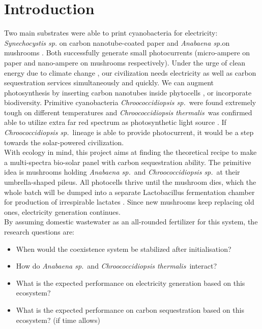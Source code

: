 \documentclass[a4paper, 11pt]{article}
\newcommand{\As}{\textit{Anabaena sp.}}
\newcommand{\Ct}{\textit{Chroococcidiopsis thermalis}}
\newcommand{\Cs}{\textit{Chroococcidiopsis sp.}}
\begin{document}
\section{Introduction}
Two main substrates were able to print cyanobacteria for electricity:  \textit{Synechocystis sp.} on carbon nanotube-coated paper \autocite{sawa2017electricity} and \As on mushrooms \autocite{joshi2018bacterial}.  Both successfully generate small photocurrents (micro-ampere on paper \autocite{sawa2017electricity} and nano-ampere on mushrooms \autocite{joshi2018bacterial} respectively).  Under the urge of clean energy due to climate change \autocite{schuur2015climate}, our civilization needs electricity as well as carbon sequestration services simultaneously and quickly.  We can augment photosynthesis by inserting carbon nanotubes inside phytocells \autocite{giraldo2014plant}, or incorporate biodiversity.  Primitive cyanobacteria \Cs\ were found extremely tough on different temperatures \autocite{baque2013boss} and \Ct\ was confirmed able to utilize extra far red spectrum as photosynthetic light source \autocite{nurnberg2018photochemistry}.  If \Cs\ lineage is able to provide photocurrent, it would be a step towards the solar-powered civilization.\\

With ecology in mind, this project aims at finding the theoretical recipe to make a multi-spectra bio-solar panel with carbon sequestration ability.  The primitive idea is mushrooms holding \As\ and \Cs\ at their umbrella-shaped pileus.  All photocells thrive until the mushroom dies, which the whole batch will be dumped into a separate Lactobacillus fermentation chamber for production of irrespirable lactates \autocite{senthuran1997lactic}.  Since new mushrooms keep replacing old ones, electricity generation continues.\\

By assuming domestic wastewater as an all-rounded fertilizer \autocite{markou2014microalgal} for this system, the research questions are:
\begin{itemize}
	\item When would the coexistence system be stabilized after initialisation?
	\item How do \As\ and \Ct\ interact?
	\item What is the expected performance on electricity generation based on this ecosystem?
	\item What is the expected performance on carbon sequestration based on this ecosystem? (if time allows)
\end{itemize}
\end{document}
